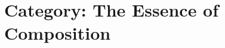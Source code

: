 


% 



\chapter{Category: The Essence of Composition}\label{category-the-essence-of-composition}












